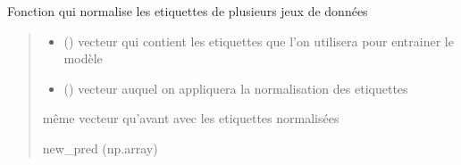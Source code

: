 \documentclass[letterpaper,10pt,french]{sphinxmanual}
\begin{document}

\begin{fulllineitems}
\label{\detokenize{general:general.Label_Encode}}
\pysigstartsignatures
{}
\pysigstopsignatures
\sphinxAtStartPar
Fonction qui normalise les etiquettes de plusieurs jeux de données
\begin{quote}\begin{description}
\begin{itemize}
\item {} 
\sphinxAtStartPar
{} () \textendash{} vecteur qui contient les etiquettes que l’on utilisera pour entrainer le modèle

\item {} 
\sphinxAtStartPar
{} () \textendash{} vecteur auquel on appliquera la normalisation des etiquettes

\end{itemize}

\sphinxAtStartPar
même vecteur qu’avant avec les etiquettes normalisées

\sphinxAtStartPar
new\_pred (np.array)

\end{description}\end{quote}

\end{fulllineitems}

\end{document}
